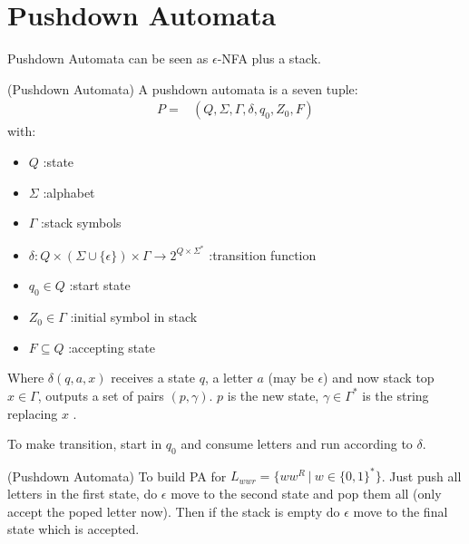 
\usepackage{../../lectures_preamble}


    \section{Pushdown Automata}
        Pushdown Automata can be seen as $\epsilon$-NFA plus a stack.
        \begin{definition}
            (Pushdown Automata) A pushdown automata is a seven tuple:
            \begin{align}
                P=&(Q,\Sigma,\Gamma,\delta,q_0,Z_0,F)\nonumber
            \end{align}
            with:
            \begin{itemize}
                \item $Q$ :state
                \item $\Sigma$ :alphabet
                \item $\Gamma$ :stack symbols
                \item $\delta:Q\times (\Sigma\cup\{\epsilon\})\times \Gamma\rightarrow 2^{Q\times \Sigma^{*}}$ :transition function
                \item $q_0\in Q$ :start state
                \item $Z_0\in \Gamma$ :initial symbol in stack
                \item $F\subseteq Q$ :accepting state
            \end{itemize}
            Where $\delta(q,a,x)$ receives a state $q$, a letter $a$ (may be $\epsilon$) and now stack top $x\in \Gamma$, outputs a set of pairs $(p,\gamma)$. $p$ is the new state, $\gamma\in \Gamma^{*}$ is the string replacing $x$ .

            To make transition, start in $q_0$ and consume letters and run according to $\delta$.
        \end{definition}
        \begin{example}
            \label{example:Pushdown Automata}
            (Pushdown Automata) To build PA for $L_{wwr}=\{ww^{R}\ |\ w\in \{0,1\}^{*}\}$. Just push all letters in the first state, do $\epsilon$ move to the second state and pop them all (only accept the poped letter now). Then if the stack is empty do $\epsilon$ move to the final state which is accepted.
        \end{example}

